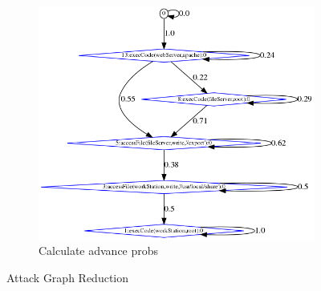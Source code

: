\begin{figure}
        \begin{subfigure}[t]{0.3\textwidth}
        \centering
        \includegraphics[width=\linewidth]{resource/img/ch_background/sdn_analytics/tmatrix_graphs/nameMe_007_weighEdges.png} 
        \caption{Calculate advance probs} 
        \label{fig:tg_008}
    \end{subfigure}
    \hfill
    \caption{Attack Graph Reduction}
    \label{fig:transGraph}
\end{figure}